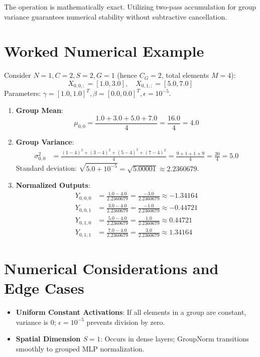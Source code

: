 \documentclass[11pt,a4paper]{article}
\theoremstyle{definition}
\begin{document}
The operation is mathematically exact. Utilizing two-pass accumulation for group variance guarantees numerical stability without subtractive cancellation.

\section{Worked Numerical Example}

Consider $N = 1, C = 2, S = 2, G = 1$ (hence $C_G = 2$, total elements $M = 4$):
\begin{equation}
X_{0, 0, :} = [1.0, 3.0], \quad X_{0, 1, :} = [5.0, 7.0]
\end{equation}
Parameters: $\gamma = [1.0, 1.0]^T, \beta = [0.0, 0.0]^T, \epsilon = 10^{-5}$.

\begin{enumerate}
    \item \textbf{Group Mean}:
    \begin{equation}
    \mu_{0, 0} = \frac{1.0 + 3.0 + 5.0 + 7.0}{4} = \frac{16.0}{4} = 4.0
    \end{equation}
    \item \textbf{Group Variance}:
    \begin{align}
    \sigma_{0, 0}^2 &= \frac{(1-4)^2 + (3-4)^2 + (5-4)^2 + (7-4)^2}{4} = \frac{9 + 1 + 1 + 9}{4} = \frac{20}{4} = 5.0
    \end{align}
    Standard deviation: $\sqrt{5.0 + 10^{-5}} = \sqrt{5.00001} \approx 2.2360679$.
    \item \textbf{Normalized Outputs}:
    \begin{align}
    Y_{0, 0, 0} &= \frac{1.0 - 4.0}{2.2360679} = \frac{-3.0}{2.2360679} \approx -1.34164 \\
    Y_{0, 0, 1} &= \frac{3.0 - 4.0}{2.2360679} = \frac{-1.0}{2.2360679} \approx -0.44721 \\
    Y_{0, 1, 0} &= \frac{5.0 - 4.0}{2.2360679} = \frac{1.0}{2.2360679} \approx 0.44721 \\
    Y_{0, 1, 1} &= \frac{7.0 - 4.0}{2.2360679} = \frac{3.0}{2.2360679} \approx 1.34164
    \end{align}
\end{enumerate}

\section{Numerical Considerations and Edge Cases}

\begin{itemize}
    \item \textbf{Uniform Constant Activations}: If all elements in a group are constant, variance is $0$; $\epsilon = 10^{-5}$ prevents division by zero.
    \item \textbf{Spatial Dimension $S = 1$}: Occurs in dense layers; GroupNorm transitions smoothly to grouped MLP normalization.
\end{itemize}
\end{document}
